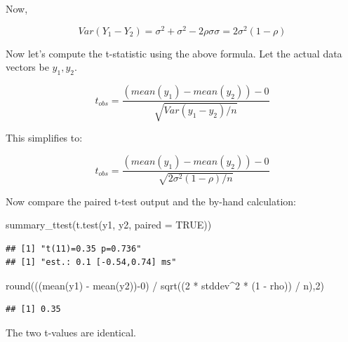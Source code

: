 \documentclass[
  12pt,
]{krantz}
\newenvironment{Shaded}{\begin{snugshade}}{\end{snugshade}}
\newcommand{\AttributeTok}[1]{\textcolor[rgb]{0.77,0.63,0.00}{#1}}
\newcommand{\ConstantTok}[1]{\textcolor[rgb]{0.00,0.00,0.00}{#1}}
\newcommand{\DecValTok}[1]{\textcolor[rgb]{0.00,0.00,0.81}{#1}}
\newcommand{\FunctionTok}[1]{\textcolor[rgb]{0.00,0.00,0.00}{#1}}
\newcommand{\NormalTok}[1]{#1}
\newcommand{\SpecialCharTok}[1]{\textcolor[rgb]{0.00,0.00,0.00}{#1}}
\theoremstyle{definition}
\theoremstyle{definition}
\theoremstyle{definition}
\theoremstyle{definition}
\theoremstyle{remark}
\begin{document}
Now,

\begin{equation}
Var(Y_1 - Y_2) = \sigma^2 + \sigma^2 - 2 \rho \sigma\sigma = 2\sigma^2 (1-\rho)
\end{equation}

Now let's compute the t-statistic using the above formula. Let the actual data vectors be \(y_1, y_2\).

\begin{equation}
t_{obs} = \frac{(mean(y_1) - mean(y_2))-0}{\sqrt{Var(y_1 - y_2)/n}}
\end{equation}

This simplifies to:

\begin{equation}
t_{obs} = \frac{(mean(y_1) - mean(y_2))-0}{\sqrt{2\sigma^2(1-\rho)/n}}
\end{equation}

Now compare the paired t-test output and the by-hand calculation:

\begin{Shaded}
\begin{Highlighting}[]
\FunctionTok{summary\_ttest}\NormalTok{(}\FunctionTok{t.test}\NormalTok{(y1, y2, }\AttributeTok{paired =} \ConstantTok{TRUE}\NormalTok{))}
\end{Highlighting}
\end{Shaded}

\begin{verbatim}
## [1] "t(11)=0.35 p=0.736"
## [1] "est.: 0.1 [-0.54,0.74] ms"
\end{verbatim}

\begin{Shaded}
\begin{Highlighting}[]
\FunctionTok{round}\NormalTok{(((}\FunctionTok{mean}\NormalTok{(y1) }\SpecialCharTok{{-}} \FunctionTok{mean}\NormalTok{(y2))}\SpecialCharTok{{-}}\DecValTok{0}\NormalTok{) }\SpecialCharTok{/} 
        \FunctionTok{sqrt}\NormalTok{((}\DecValTok{2} \SpecialCharTok{*}\NormalTok{ stddev}\SpecialCharTok{\^{}}\DecValTok{2} \SpecialCharTok{*}\NormalTok{ (}\DecValTok{1} \SpecialCharTok{{-}}\NormalTok{ rho)) }\SpecialCharTok{/}\NormalTok{ n),}\DecValTok{2}\NormalTok{)}
\end{Highlighting}
\end{Shaded}

\begin{verbatim}
## [1] 0.35
\end{verbatim}

The two t-values are identical.
\end{document}

